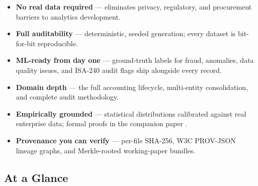 \documentclass[11pt,a4paper]{article}
\begin{document}
\begin{tcolorbox}[keybox={Why DataSynth?}]
\begin{itemize}[leftmargin=1.2em, itemsep=3pt]
  \item \textbf{No real data required} --- eliminates privacy, regulatory, and
        procurement barriers to analytics development.
  \item \textbf{Full auditability} --- deterministic, seeded generation;
        every dataset is bit-for-bit reproducible.
  \item \textbf{ML-ready from day one} --- ground-truth labels for fraud,
        anomalies, data quality issues, and ISA-240 audit flags ship
        alongside every record.
  \item \textbf{Domain depth} --- the full accounting lifecycle, multi-entity
        consolidation, and complete audit methodology.
  \item \textbf{Empirically grounded} --- statistical distributions calibrated
        against real enterprise data; formal proofs in the companion paper
        \citep{ivertowski2026datasynth}.
  \item \textbf{Provenance you can verify} --- per-file SHA-256, W3C PROV-JSON
        lineage graphs, and Merkle-rooted working-paper bundles.
\end{itemize}
\end{tcolorbox}

\subsection{At a Glance}
\end{document}
